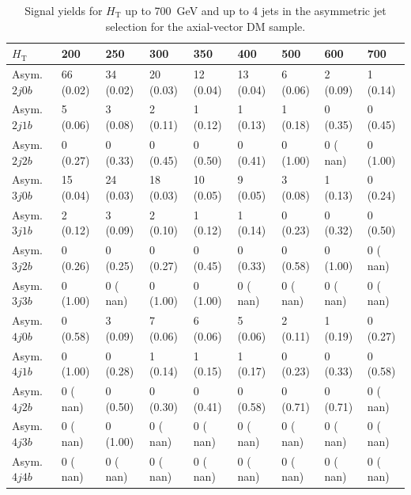 \begin{table}[h]
\begin{tabular}{lllllllll}
\hline \hline
$H_\textrm{T}$                 &     200 &            250 &             300&             350&             400&             500&             600&             700  \\\hline\hline
Asym. $2j 0b$&     66 (0.02)&	   34 (0.02)&	   20 (0.03)&	   12 (0.04)&	   13 (0.04)&	    6 (0.06)&	    2 (0.09)&	    1 (0.14) \\\hline
Asym. $2j 1b$&      5 (0.06)&	    3 (0.08)&	    2 (0.11)&	    1 (0.12)&	    1 (0.13)&	    1 (0.18)&	    0 (0.35)&	    0 (0.45) \\\hline
Asym. $2j 2b$&      0 (0.27)&	    0 (0.33)&	    0 (0.45)&	    0 (0.50)&	    0 (0.41)&	    0 (1.00)&	    0 ( nan)&	    0 (1.00) \\\hline
Asym. $3j 0b$&     15 (0.04)&	   24 (0.03)&	   18 (0.03)&	   10 (0.05)&	    9 (0.05)&	    3 (0.08)&	    1 (0.13)&	    0 (0.24) \\\hline
Asym. $3j 1b$&      2 (0.12)&	    3 (0.09)&	    2 (0.10)&	    1 (0.12)&	    1 (0.14)&	    0 (0.23)&	    0 (0.32)&	    0 (0.50) \\\hline
Asym. $3j 2b$&      0 (0.26)&	    0 (0.25)&	    0 (0.27)&	    0 (0.45)&	    0 (0.33)&	    0 (0.58)&	    0 (1.00)&	    0 ( nan) \\\hline
Asym. $3j 3b$&      0 (1.00)&	    0 ( nan)&	    0 (1.00)&	    0 (1.00)&	    0 ( nan)&	    0 ( nan)&	    0 ( nan)&	    0 ( nan) \\\hline
Asym. $4j 0b$&      0 (0.58)&	    3 (0.09)&	    7 (0.06)&	    6 (0.06)&	    5 (0.06)&	    2 (0.11)&	    1 (0.19)&	    0 (0.27) \\\hline
Asym. $4j 1b$&      0 (1.00)&	    0 (0.28)&	    1 (0.14)&	    1 (0.15)&	    1 (0.17)&	    0 (0.23)&	    0 (0.33)&	    0 (0.58) \\\hline
Asym. $4j 2b$&      0 ( nan)&	    0 (0.50)&	    0 (0.30)&	    0 (0.41)&	    0 (0.58)&	    0 (0.71)&	    0 (0.71)&	    0 ( nan) \\\hline
Asym. $4j 3b$&      0 ( nan)&	    0 (1.00)&	    0 ( nan)&	    0 ( nan)&	    0 ( nan)&	    0 ( nan)&	    0 ( nan)&	    0 ( nan) \\\hline
Asym. $4j 4b$&      0 ( nan)&	    0 ( nan)&	    0 ( nan)&	    0 ( nan)&	    0 ( nan)&	    0 ( nan)&	    0 ( nan)&	    0 ( nan) \\\hline
\hline              
\end{tabular}
\caption{Signal yields for $H_\textrm{T}$ up to 700~GeV and up to 4 jets in the asymmetric jet selection for the axial-vector DM sample.}
\label{tab:sig_yields_AVDM_asym}
\end{table}





